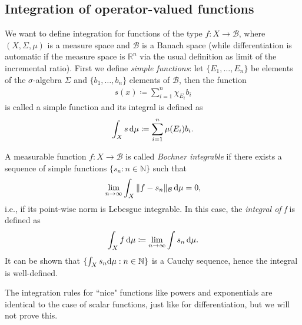 \begin{appendices}
\chapter{Integration of operator-valued functions}
\label{appendix:bochner-integral}

We want to define integration for functions of the type $f:X\to\mathcal{B}$, where $(X,\Sigma,\mu)$
is a measure space and $\mathcal{B}$ is a Banach space (while differentiation is automatic if
the measure space is $\mathbb{R}^n$ via the usual definition as limit of the incremental ratio).
First we define \textit{simple functions}: let $\{E_1,\ldots,E_n\}$ be elements of the
$\sigma$-algebra $\Sigma$ and $\{b_1,\ldots,b_n\}$ elements of $\mathcal{B}$, then the function
\begin{align*}
	s(x) \coloneq \sum_{i=1}^n \chi_{E_i} b_i
\end{align*}
is called a simple function and its integral is defined as
\begin{align*}
	\int_X s\,\mathrm{d}\mu \coloneq \sum_{i=1}^n \mu(E_i) b_i.
\end{align*}

\begin{definition}
	A measurable function $f:X\to\mathcal{B}$ is called \textit{Bochner integrable} if there
	exists a sequence of simple functions $\{s_n:n\in\mathbb{N}\}$ such that
	\begin{align*}
		\lim_{n\to\infty} \int_X \Vert f - s_n\Vert_{\mathcal{B}}\,\mathrm{d}\mu = 0,
	\end{align*}
	i.e., if its point-wise norm is Lebesgue integrable. In this case, the \textit{integral of f}
	is defined as
	\begin{align*}
		\int_X f\,\mathrm{d}\mu \coloneq \lim_{n\to\infty}\int s_n\,\mathrm{d}\mu.
	\end{align*}
	It can be shown that $\{\int_X s_n\mathrm{d}\mu:n\in\mathbb{N}\}$ is a Cauchy sequence, hence the
	integral is well-defined.
\end{definition}

\begin{remark}
	The integration rules for ``nice" functions like powers and exponentials are identical to
	the case of scalar functions, just like for differentiation, but we will not prove this.
\end{remark}


\end{appendices}
